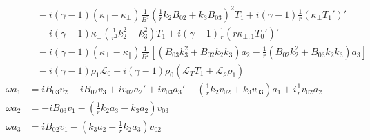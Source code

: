 \documentclass[11pt, fleqn]{article}
\newcommand{\HL}{\mathscr{L}}
\begin{document}
\begin{equation}
\begin{aligned}
											&~~~~ - i(\gamma - 1)(\kappa_\parallel - \kappa_\bot)\frac{1}{B^2}\left(\frac{1}{r}k_2B_{02} + k_3B_{03}\right)^2T_1 + i(\gamma - 1)\frac{1}{r}(\kappa_\bot T_1')'															\\
											&~~~~ - i(\gamma - 1)\kappa_\bot\left(\frac{1}{r^2}k_2^2 + k_3^2\right)T_1 + i(\gamma - 1)\frac{1}{r}(r\kappa_{\bot, 1}T_0')'																																		\\
											&~~~~ + i(\gamma - 1)(\kappa_\bot - \kappa_\parallel)\frac{1}{B^2}\left[(B_{03}k_3^2 + B_{02}k_2k_3)a_2 - \frac{1}{r}(B_{02}k_2^2 + B_{03}k_2k_3)a_3\right]																			\\
											&~~~~ - i(\gamma - 1)\rho_1\HL_0 - i(\gamma - 1)\rho_0(\HL_T T_1 + \HL_\rho \rho_1)																																																							\\[8pt]
		\omega a_1				&= iB_{03}v_2 - iB_{02}v_3 + iv_{02}a_2' + iv_{03}a_3' + \left(\frac{1}{r}k_2v_{02} + k_3v_{03}\right)a_1 + i\frac{1}{r}v_{02}a_2																																\\[8pt]
		\omega a_2				&= -iB_{03}v_1 - \left(\frac{1}{r}k_2a_3 - k_3a_2\right)v_{03}																																																																	\\[8pt]
		\omega a_3				&=  iB_{02}v_1 - \left(k_3a_2 - \frac{1}{r}k_2a_3\right)v_{02}
	\end{aligned}
\end{equation}

\newpage
\end{document}
